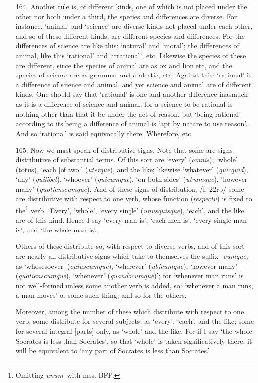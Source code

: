 \documentclass[]{article}
\begin{document}
\begin{itemize}
\item[164.] Another rule is, of different kinds, one of which is not placed under the other nor both under a third, the species and differences are diverse. For instance, `animal' and `science' are diverse kinds not placed under each other, and so of these different kinds, are different species and differences. For the differences of science are like this: `natural' and `moral'; the differences of animal, like this `rational' and `irrational', etc. Likewise the species of these are different, since the species of animal are as ox and lion etc, and the species of science are as grammar and dialectic, etc. Against this: `rational' is a difference of science and animal, and yet science and animal are of different kinds. One should say that `rational' is one and another difference inasmuch as it is a difference of science and animal, for a science to be rational is nothing other than that it be under the act of reason, but `being rational' according to its being a difference of animal is `apt by nature to use reason'. And so `rational' is said equivocally there. Wherefore, etc.
\item[165.] Now we must speak of distributive signs. Note that some are signs distributive of substantial terms. Of this sort are `every' (\textit{omnis}), `whole' (totus), `each [of two]' (\textit{uterque}), and the like; likewise `whatever' (\textit{quicquid}), `any' (\textit{quilibet}), `whoever' (\textit{quicumque}), `on both sides' (\textit{utrumque}), `however many' (\textit{quotienscumque}). And of these signs of distribution, /f. 22rb/ some are distributive with respect to one verb, whose function (\textit{respectu}) is fixed to the\footnote{Omitting \textit{unum}, with mss. BFP.} verb. `Every', `whole', `every single' (\textit{unusquisque}), `each', and the like are of this kind. Hence I say `every man is', `each men is', `every single man is', and `the whole man is'. 

Others of these distribute so, with respect to diverse verbs, and of this sort are nearly all distributive signs which take to themselves the suffix \textit{-cumque}, as `whosesoever' (\textit{cuiuscumque}), `wherever' (\textit{ubicumque}), `however many' (\textit{quotienscumque}), `whenever' (\textit{quandocumque})'; for `whenever man runs' is not well-formed unless some another verb is added, so: `whenever a man runs, a man moves' or some such thing; and so for the others. 

Moreover, among the number of these which distribute with respect to one verb, some distribute for several subjects, as `every', `each', and the like; some for several integral [parts] only, as `whole' and the like. For if I say `the whole Socrates is less than Socrates', so that `whole' is taken significatively there, it will be equivalent to `any part of Socrates is less than Socrates.' 


\end{itemize}
\end{document}
